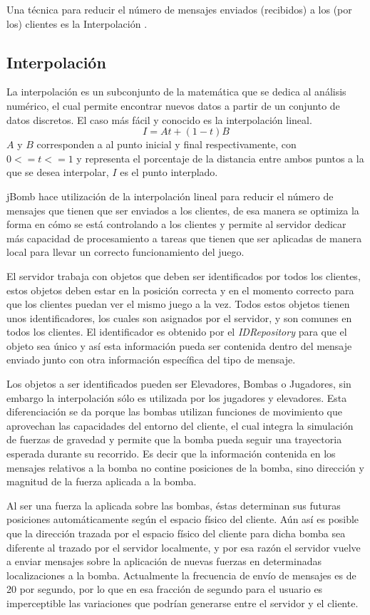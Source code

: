 \documentclass[a4paper,12pt,openany,oneside]{book}
\begin{document}
Una técnica para reducir el número de mensajes enviados (recibidos) a los (por los) clientes es la Interpolación \cite{VALVE1}.
\subsection{Interpolación} 
La interpolación es un subconjunto de la matemática que se dedica al análisis numérico, el cual permite encontrar nuevos datos a partir de un conjunto de datos discretos. El caso más fácil y conocido es la interpolación lineal.
$$I = At + (1-t)B$$
$A$ y $B$ corresponden a al punto inicial y final respectivamente, con $0 <= t <= 1$ y representa el porcentaje de la distancia entre ambos puntos a la que se desea interpolar, $I$ es el punto interplado.

jBomb hace utilización de la interpolación lineal para reducir el número de mensajes que tienen que ser enviados a los clientes, de esa manera se optimiza la forma en cómo se está controlando a los clientes y permite al servidor dedicar más capacidad de procesamiento a tareas que tienen que ser aplicadas de manera local para llevar un correcto funcionamiento del juego.

El servidor trabaja con objetos que deben ser identificados por todos los clientes, estos objetos deben estar en la posición correcta y en el momento correcto para que los clientes puedan ver el mismo juego a la vez. Todos estos objetos tienen unos identificadores, los cuales son asignados por el servidor, y son comunes en todos los clientes. El identificador es obtenido por el \textit{IDRepository} para que el objeto sea único y así esta información pueda ser contenida dentro del mensaje enviado junto con otra información específica del tipo de mensaje.

Los objetos a ser identificados pueden ser Elevadores, Bombas o Jugadores, sin embargo la interpolación sólo es utilizada por los jugadores y elevadores. Esta diferenciación se da porque las bombas utilizan funciones de movimiento que aprovechan las capacidades del entorno del cliente, el cual integra la simulación de fuerzas de gravedad y permite que la bomba pueda seguir una trayectoria esperada durante su recorrido. Es decir que la información contenida en los mensajes relativos a la bomba no contine posiciones de la bomba, sino dirección y magnitud de la fuerza aplicada a la bomba.

Al ser una fuerza la aplicada sobre las bombas, éstas determinan sus futuras posiciones automáticamente según el espacio físico del cliente. Aún así es posible que la dirección trazada por el espacio físico del cliente para dicha bomba sea diferente al trazado por el servidor localmente, y por esa razón el servidor vuelve a enviar mensajes sobre la aplicación de nuevas fuerzas en determinadas localizaciones a la bomba. Actualmente la frecuencia de envío de mensajes es de 20 por segundo, por lo que en esa fracción de segundo para el usuario es imperceptible las variaciones que podrían generarse entre el servidor y el cliente.
\end{document}
